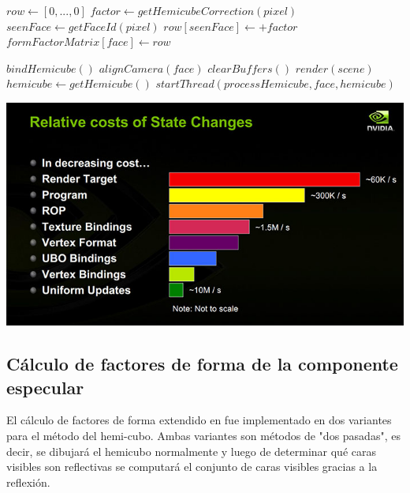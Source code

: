 \begin{minipage}{\linewidth}
	\label{alg:hemicube}
	\begin{algorithmic}
			\State $row \gets [0,...,0]$
				\State $factor \gets getHemicubeCorrection(pixel)$
				\State $seenFace \gets getFaceId(pixel)$
					\State $row[seenFace] \gets + factor$
					\State $formFactorMatrix[face] \gets  row$
				\EndIf
			\EndLoop
		\EndFunction
		
			\State $bindHemicube()$
				\State $alignCamera(face)$
				\State $clearBuffers()$
				\State $render(scene)$
				\State $hemicube \gets getHemicube()$
				\State $startThread(processHemicube, face, hemicube)$
			\EndLoop
		\EndFunction
		
	\end{algorithmic}
\end{minipage}

\vspace{5mm}
\begin{minipage}[h]{\linewidth}
	\centering
	\includegraphics[width=\linewidth]{assets/statecosts}
	\label{img:statechangescost}
\end{minipage}

\subsection{Cálculo de factores de forma de la componente especular}

El cálculo de factores de forma extendido en fue implementado en dos variantes para el método del hemi-cubo. Ambas variantes son métodos de "dos pasadas", es decir, se dibujará el hemicubo normalmente y luego de determinar qué caras visibles son reflectivas se computará el conjunto de caras visibles gracias a la reflexión.

